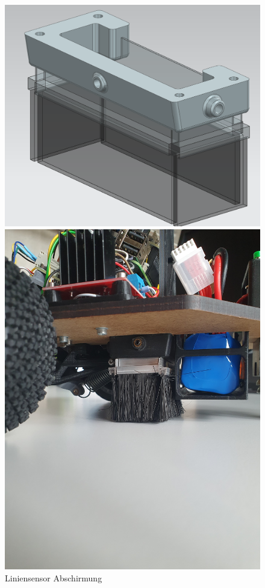 \begin{figure}[H]
\centering
\begin{minipage}[b]{0.45\textwidth}
  \centering
    \includegraphics[width=\textwidth]{assets//MT/Sensor Abdeckung.png}
    \caption{Liniensensor Abschirmung}
    \label{fig:Liniensensor Abdeckung}
\end{minipage}
\hspace{0.05\textwidth} %
\begin{minipage}[b]{0.45\textwidth}
  \centering
  \includegraphics[width=\textwidth, angle=90]{assets/MT/liniensensor-beseli.jpg}

\end{minipage}
\end{figure}
